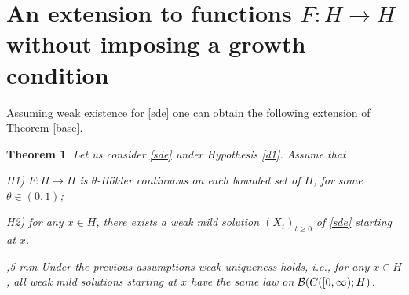 \documentclass[preprint]{imsart}
\newtheorem{theorem}{Theorem}
\begin{document}
   
\section{An extension to functions $F: H\to H$  without imposing a growth condition}
 
 
 Assuming weak existence for \eqref{sde} one can obtain the following extension of  Theorem
  \ref{base}.

  \begin{theorem}
\label{extension} 
 Let us consider \eqref{sde} under Hypothesis \ref{d1}.
 Assume   that  
 
 
  H1) $F: H \to H$ is $\theta$-H\"older continuous  on each bounded set of $H$, for some $\theta \in (0,1)$;
 
 \vskip 1mm
  
 H2) for any $x \in H$, there exists a weak mild solution $(X_t)_{t \ge 0 }$ of \eqref{sde}
 starting at $x$.   
 
,5 mm 
 Under  the previous assumptions weak uniqueness  holds, i.e., for any $x \in H$, all  weak mild solutions starting at  $x $ have the same law on ${\cal B}(C([0, \infty); H)$.      
\end{theorem}
\end{document}
